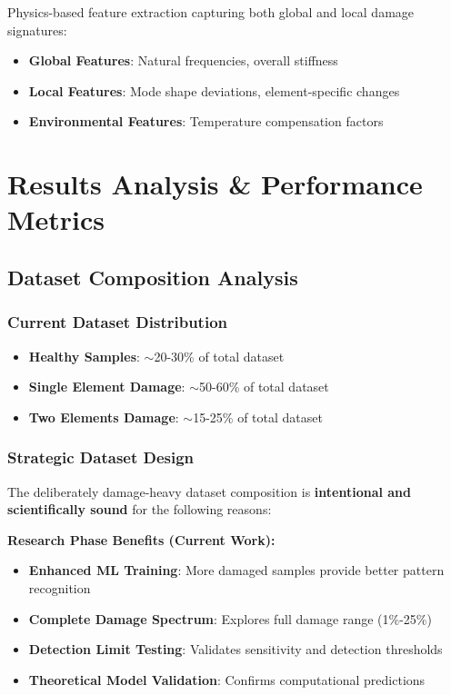 \documentclass[12pt,a4paper]{article}
\begin{document}
Physics-based feature extraction capturing both global and local damage signatures:
\begin{itemize}
    \item \textbf{Global Features}: Natural frequencies, overall stiffness
    \item \textbf{Local Features}: Mode shape deviations, element-specific changes
    \item \textbf{Environmental Features}: Temperature compensation factors
\end{itemize}

\section{Results Analysis \& Performance Metrics}

\subsection{Dataset Composition Analysis}

\subsubsection{Current Dataset Distribution}
\begin{itemize}
    \item \textbf{Healthy Samples}: $\sim$20-30\% of total dataset
    \item \textbf{Single Element Damage}: $\sim$50-60\% of total dataset
    \item \textbf{Two Elements Damage}: $\sim$15-25\% of total dataset
\end{itemize}

\subsubsection{Strategic Dataset Design}

The deliberately damage-heavy dataset composition is \textbf{intentional and scientifically sound} for the following reasons:

\textbf{Research Phase Benefits (Current Work):}
\begin{itemize}
    \item \textbf{Enhanced ML Training}: More damaged samples provide better pattern recognition
    \item \textbf{Complete Damage Spectrum}: Explores full damage range (1\%-25\%)
    \item \textbf{Detection Limit Testing}: Validates sensitivity and detection thresholds
    \item \textbf{Theoretical Model Validation}: Confirms computational predictions
\end{itemize}
\end{document}
